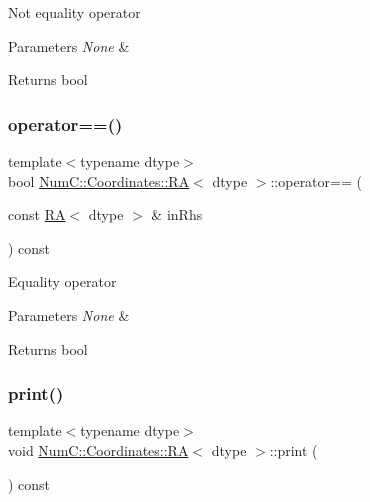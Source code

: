 Not equality operator


\begin{DoxyParams}{Parameters}
{\em None} & \\
\hline
\end{DoxyParams}
\begin{DoxyReturn}{Returns}
bool 
\end{DoxyReturn}
\mbox{\label{class_num_c_1_1_coordinates_1_1_r_a_a1f78f39f0fb716ac5bbe4ebeba333725}} 
\subsubsection{\texorpdfstring{operator==()}{operator==()}}
{\footnotesize\ttfamily template$<$typename dtype$>$ \\
bool \mbox{\hyperlink{class_num_c_1_1_coordinates_1_1_r_a}{Num\+C\+::\+Coordinates\+::\+RA}}$<$ dtype $>$\+::operator== (\begin{DoxyParamCaption}\item[{const \mbox{\hyperlink{class_num_c_1_1_coordinates_1_1_r_a}{RA}}$<$ dtype $>$ \&}]{in\+Rhs }\end{DoxyParamCaption}) const\hspace{0.3cm}{\ttfamily [inline]}}

Equality operator


\begin{DoxyParams}{Parameters}
{\em None} & \\
\hline
\end{DoxyParams}
\begin{DoxyReturn}{Returns}
bool 
\end{DoxyReturn}
\mbox{\label{class_num_c_1_1_coordinates_1_1_r_a_a5ba8bd67c092332cd02e1ed618dd3ca7}} 
\subsubsection{\texorpdfstring{print()}{print()}}
{\footnotesize\ttfamily template$<$typename dtype$>$ \\
void \mbox{\hyperlink{class_num_c_1_1_coordinates_1_1_r_a}{Num\+C\+::\+Coordinates\+::\+RA}}$<$ dtype $>$\+::print (\begin{DoxyParamCaption}{ }\end{DoxyParamCaption}) const\hspace{0.3cm}{\ttfamily [inline]}}

